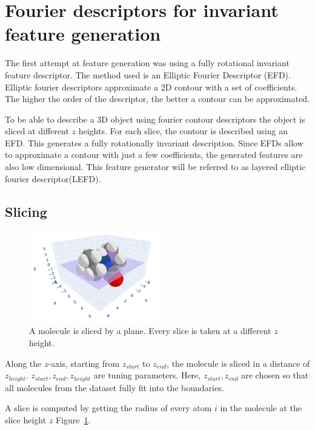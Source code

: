 \section{Fourier descriptors for invariant feature generation}

The first attempt at feature generation was using a fully rotational invariant feature descriptor.
The method used is an Elliptic Fourier Descriptor (EFD).
Elliptic fourier descriptors approximate a 2D contour with a set of coefficients.
The higher the order of the descriptor, the better a contour can be approximated.

To be able to describe a 3D object using fourier contour descriptors the object is sliced at different $z$ heights.
For each slice, the contour is described using an EFD.
This generates a fully rotationally invariant description.
Since EFDs allow to approximate a contour with just a few coefficients, the generated features
are also low dimensional.
This feature generator will be referred to as layered elliptic fourier descriptor(LEFD).

\subsection{Slicing}
\begin{figure} [h]
  \centering
  \includegraphics[width=0.5\textwidth]{figures/fourier/slice3D.png} %
  \caption[Slicing a molecule]{A molecule is sliced by a plane. Every slice is taken at a different $z$ height.}
  \label{fig:slice3D}
\end{figure}

Along the $z$-axis, starting from $z_{start}$ to $z_{end}$, the molecule is sliced in a distance of $z_{height}$.
$z_{start}, z_{end}, z_{height}$ are tuning parameters.
Here, $z_{start}, z_{end}$ are chosen so that all molecules from the dataset fully fit into the boundaries.

A slice is computed by getting the radius of every atom $i$ in the molecule at the slice height $z$ Figure~\ref{fig:slice3D}.

